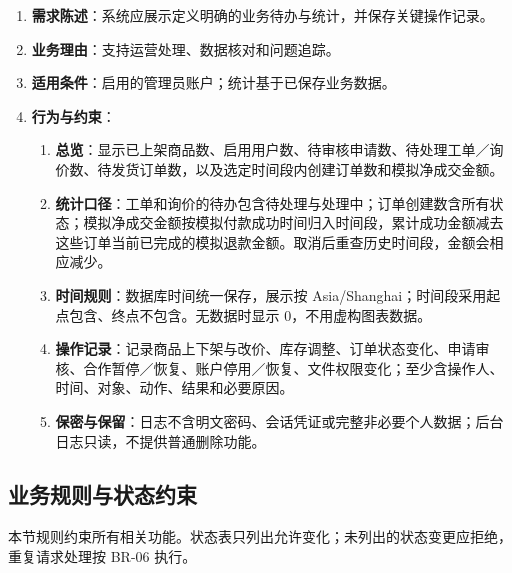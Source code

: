 \begin{enumerate}
\item {\bfseries 需求陈述}：系统应展示定义明确的业务待办与统计，并保存关键操作记录。
\item {\bfseries 业务理由}：支持运营处理、数据核对和问题追踪。
\item {\bfseries 适用条件}：启用的管理员账户；统计基于已保存业务数据。
\item {\bfseries 行为与约束}：
\begin{enumerate}
\item {\bfseries 总览}：显示已上架商品数、启用用户数、待审核申请数、待处理工单／询价数、待发货订单数，以及选定时间段内创建订单数和模拟净成交金额。
\item {\bfseries 统计口径}：工单和询价的待办包含待处理与处理中；订单创建数含所有状态；模拟净成交金额按模拟付款成功时间归入时间段，累计成功金额减去这些订单当前已完成的模拟退款金额。取消后重查历史时间段，金额会相应减少。
\item {\bfseries 时间规则}：数据库时间统一保存，展示按 Asia/Shanghai；时间段采用起点包含、终点不包含。无数据时显示 0，不用虚构图表数据。
\item {\bfseries 操作记录}：记录商品上下架与改价、库存调整、订单状态变化、申请审核、合作暂停／恢复、账户停用／恢复、文件权限变化；至少含操作人、时间、对象、动作、结果和必要原因。
\item {\bfseries 保密与保留}：日志不含明文密码、会话凭证或完整非必要个人数据；后台日志只读，不提供普通删除功能。
\end{enumerate}

\end{enumerate}

\subsection{业务规则与状态约束}\label{sec:33-业务规则与状态约束}

本节规则约束所有相关功能。状态表只列出允许变化；未列出的状态变更应拒绝，重复请求处理按 BR-06 执行。


